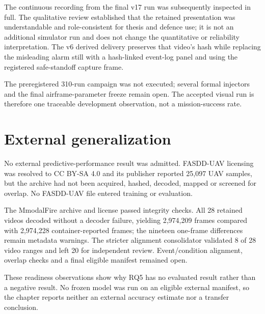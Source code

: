 The continuous recording from the final v17 run was subsequently inspected in
full. The qualitative review established that the retained presentation was
understandable and role-consistent for thesis and defence use;
it is not an additional simulator run and does not change the quantitative or
reliability interpretation. The v6 derived delivery preserves that video's
hash while replacing the misleading alarm still with a hash-linked event-log
panel and using the registered safe-standoff capture frame.

The preregistered 310-run campaign was not executed; several formal injectors
and the final airframe-parameter freeze remain open. The accepted visual run is
therefore one traceable development observation, not a mission-success rate.

\section{External generalization}
\label{sec:results:7}

No external predictive-performance result was admitted. FASDD-UAV licensing
was resolved to CC BY-SA 4.0 and its publisher reported 25,097 UAV samples,
but the archive had not been acquired, hashed, decoded, mapped or screened for
overlap. No FASDD-UAV file entered training or evaluation.

The MmodalFire archive and license passed integrity checks. All 28 retained
videos decoded without a decoder failure, yielding 2,974,209 frames compared
with 2,974,228 container-reported frames; the nineteen one-frame differences
remain metadata warnings. The stricter alignment consolidator validated 8 of
28 video ranges and left 20 for independent review. Event/condition alignment,
overlap checks and a final eligible manifest remained open.

These readiness observations show why RQ5 has no evaluated result rather than a
negative result.
No frozen model was run on an eligible external manifest, so the chapter
reports neither an external accuracy estimate nor a transfer conclusion.

